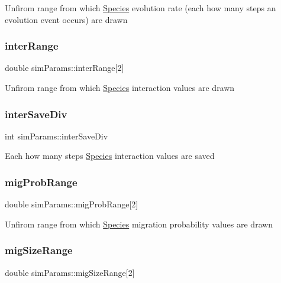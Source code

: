 Unfirom range from which \hyperlink{classSpecies}{Species} evolution rate (each how many steps an evolution event occurs) are drawn \hypertarget{structsimParams_a459d8e2a902ef06f2e6ccce91a5f40bc}{}\label{structsimParams_a459d8e2a902ef06f2e6ccce91a5f40bc} 
\subsubsection{\texorpdfstring{inter\+Range}{interRange}}
{\footnotesize\ttfamily double sim\+Params\+::inter\+Range\mbox{[}2\mbox{]}}

Unfirom range from which \hyperlink{classSpecies}{Species} interaction values are drawn \hypertarget{structsimParams_a2114f7c6664772255e0e8afcf9334ebf}{}\label{structsimParams_a2114f7c6664772255e0e8afcf9334ebf} 
\subsubsection{\texorpdfstring{inter\+Save\+Div}{interSaveDiv}}
{\footnotesize\ttfamily int sim\+Params\+::inter\+Save\+Div}

Each how many steps \hyperlink{classSpecies}{Species} interaction values are saved \hypertarget{structsimParams_a4a67c773b31598604c56efc130a69945}{}\label{structsimParams_a4a67c773b31598604c56efc130a69945} 
\subsubsection{\texorpdfstring{mig\+Prob\+Range}{migProbRange}}
{\footnotesize\ttfamily double sim\+Params\+::mig\+Prob\+Range\mbox{[}2\mbox{]}}

Unfirom range from which \hyperlink{classSpecies}{Species} migration probability values are drawn \hypertarget{structsimParams_a2486796d56e9fbe5d9f2dbd507a6ce5d}{}\label{structsimParams_a2486796d56e9fbe5d9f2dbd507a6ce5d} 
\subsubsection{\texorpdfstring{mig\+Size\+Range}{migSizeRange}}
{\footnotesize\ttfamily double sim\+Params\+::mig\+Size\+Range\mbox{[}2\mbox{]}}

